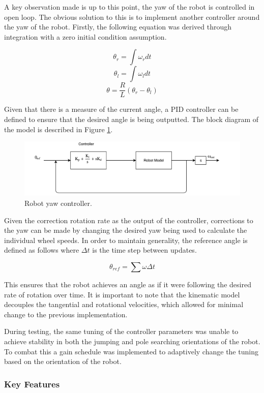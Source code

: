 \documentclass[ece]{uw-wkrpt}
\begin{document}
A key observation made is up to this point, the yaw of the robot is controlled in open loop. The obvious solution to this is to implement another controller around the yaw of the robot. Firstly, the following equation was derived through integration with a zero initial condition assumption.

\[\theta_r = \int\omega_rdt\]
\[\theta_l = \int\omega_ldt\]
\[\theta=\frac{R}{L}(\theta_r-\theta_l)\]

Given that there is a measure of the current angle, a PID controller can be defined to ensure that the desired angle is being outputted. The block diagram of the model is described in Figure \ref{fig:yawController}.

\begin{figure}
    \centering
    \includegraphics[width=5.5in]{res/yawController}
    \caption[Robot yaw controller]
          {Robot yaw controller.}
    \label{fig:yawController}
\end{figure}

Given the correction rotation rate as the output of the controller, corrections to the yaw can be made by changing the desired yaw being used to calculate the individual wheel speeds. In order to maintain generality, the reference angle is defined as follows where $\Delta t$ is the time step between updates. 

\[\theta_{ref} = \sum\omega \Delta t\]

This ensures that the robot achieves an angle as if it were following the desired rate of rotation over time. It is important to note that the kinematic model decouples the tangential and rotational velocities, which allowed for minimal change to the previous implementation. 

During testing, the same tuning of the controller parameters was unable to achieve stability in both the jumping and pole searching orientations of the robot. To combat this a gain schedule was implemented to adaptively change the tuning based on the orientation of the robot. 

\subsubsection{Key Features}
\end{document}
